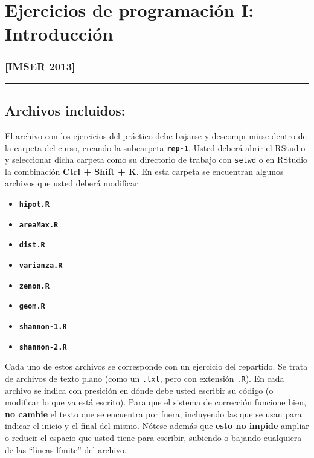 \documentclass[]{article}
\begin{document}
\section{Ejercicios de programación I: Introducción}

\subsubsection{{[}IMSER 2013{]}}

\begin{center}\rule{3in}{0.4pt}\end{center}

\subsection{Archivos incluidos:}

El archivo con los ejercicios del práctico debe bajarse y descomprimirse
dentro de la carpeta del curso, creando la subcarpeta
\textbf{\texttt{rep-1}}. Usted deberá abrir el RStudio y seleccionar
dicha carpeta como su directorio de trabajo con \texttt{setwd} o en
RStudio la combinación \textbf{Ctrl + Shift + K}. En esta carpeta se
encuentran algunos archivos que usted deberá modificar:

\begin{itemize}
\item
  \textbf{\texttt{hipot.R}}
\item
  \textbf{\texttt{areaMax.R}}
\item
  \textbf{\texttt{dist.R}}
\item
  \textbf{\texttt{varianza.R}}
\item
  \textbf{\texttt{zenon.R}}
\item
  \textbf{\texttt{geom.R}}
\item
  \textbf{\texttt{shannon-1.R}}
\item
  \textbf{\texttt{shannon-2.R}}
\end{itemize}
Cada uno de estos archivos se corresponde con un ejercicio del
repartido. Se trata de archivos de texto plano (como un \texttt{.txt},
pero con extensión \texttt{.R}). En cada archivo se indica con presición
en dónde debe usted escribir su código (o modificar lo que ya está
escrito). Para que el sistema de corrección funcione bien, \textbf{no
cambie} el texto que se encuentra por fuera, incluyendo las que se usan
para indicar el inicio y el final del mismo. Nótese además que
\textbf{esto no impide} ampliar o reducir el espacio que usted tiene
para escribir, subiendo o bajando cualquiera de las ``líneas límite''
del archivo.
\end{document}
